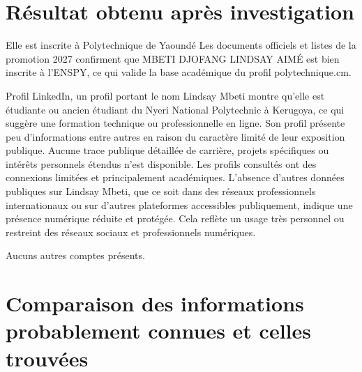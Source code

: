 \documentclass[12pt, a4paper]{article}
\begin{document}
	\section{\textbf{Résultat obtenu après investigation}\label{resultats}}
	
	Elle est inscrite à Polytechnique de Yaoundé Les documents officiels et listes de la promotion 2027 confirment que MBETI DJOFANG LINDSAY AIMÉ est bien inscrite à l'ENSPY, ce qui valide la base académique du profil polytechnique.cm.
	
	Profil LinkedIn, un profil portant le nom Lindsay Mbeti montre qu'elle est étudiante ou ancien étudiant du Nyeri National Polytechnic à Kerugoya, ce qui suggère une formation technique ou professionnelle en ligne. Son profil présente peu d'informations entre autres en raison du caractère limité de leur exposition publique. Aucune trace publique détaillée de carrière, projets spécifiques ou intérêts personnels étendus n'est disponible. Les profils consultés ont des connexions limitées et principalement académiques. L'absence d'autres données publiques sur Lindsay Mbeti, que ce soit dans des réseaux professionnels internationaux ou sur d'autres plateformes accessibles publiquement, indique une présence numérique réduite et protégée. Cela reflète un usage très personnel ou restreint des réseaux sociaux et professionnels numériques.
	
	Aucuns autres comptes présents.
	
	\newpage
	
	\section{\textbf{Comparaison des informations probablement connues et celles trouvées}\label{comparaison}}
	
\end{document}
